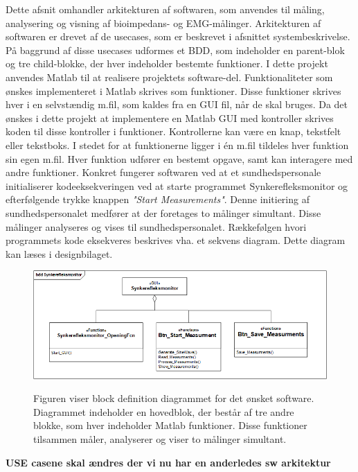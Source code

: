 Dette afsnit omhandler arkitekturen af softwaren, som anvendes til måling, analysering og visning af bioimpedans- og EMG-målinger. Arkitekturen af softwaren er drevet af de usecases, som er beskrevet i afsnittet systembeskrivelse. På baggrund af disse usecases udformes et BDD, som indeholder en parent-blok og tre child-blokke, der hver indeholder bestemte funktioner.
I dette projekt anvendes  Matlab til at realisere projektets  software-del.  Funktionaliteter som ønskes implementeret i Matlab skrives som funktioner. Disse funktioner skrives hver i en selvstændig m.fil, som kaldes fra en GUI fil, når de skal bruges. Da det ønskes i dette projekt at implementere en Matlab GUI med kontroller skrives koden til disse kontroller i funktioner. Kontrollerne kan være en knap, tekstfelt eller tekstboks. I stedet for at funktionerne ligger i én m.fil tildeles hver funktion sin egen m.fil. Hver funktion udfører en bestemt opgave, samt kan interagere med andre funktioner. Konkret fungerer softwaren ved at et sundhedspersonale initialiserer kodeeksekveringen ved at starte programmet Synkerefleksmonitor og efterfølgende trykke knappen \textit{"Start Measurements"}. Denne initiering af sundhedspersonalet medfører at der foretages to målinger simultant. Disse målinger analyseres og vises til sundhedspersonalet. Rækkefølgen hvori programmets kode eksekveres beskrives vha. et sekvens diagram. Dette diagram kan læses i designbilaget.    


\begin{figure}[H] 
\centering
{\includegraphics[width=\linewidth]
{Figure/SWIBD}}
\caption{Figuren viser block definition diagrammet for det ønsket software. Diagrammet indeholder en hovedblok, der består af tre andre blokke, som hver indeholder Matlab funktioner. Disse funktioner tilsammen måler, analyserer og viser to målinger simultant.}
\label{figScrip}
\end{figure}

\textbf{USE casene skal ændres der vi nu har en anderledes sw arkitektur}

\citep{Aroom2009}

